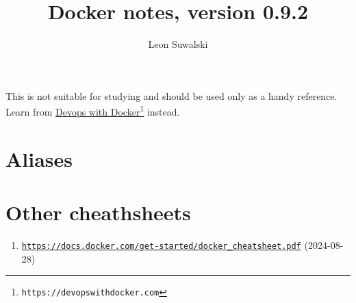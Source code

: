 \documentclass{charun}
\title{Docker notes, version 0.9.2}
\author{Leon Suwalski}
\begin{document}
\begin{multicols}{2}
\maketitle
\raggedright

This is not suitable for studying and should be used only as a handy reference.
Learn from \href{https://devopswithdocker.com}{\underline{Devops with Docker}}\footnote{\texttt{https://devopswithdocker.com}} instead.










\section{Aliases}


\section{Other cheathsheets}
\begin{enumerate}
    \item \footnotesize{\href{https://docs.docker.com/get-started/docker_cheatsheet.pdf}{\texttt{https://docs.docker.com/get-started/docker\_cheatsheet.pdf}} (2024-08-28)}
\end{enumerate}

\end{multicols}
\end{document}

